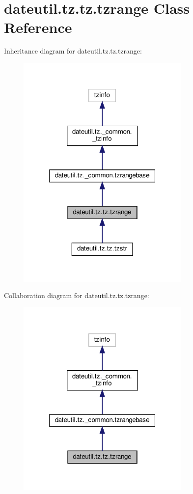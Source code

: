 \hypertarget{classdateutil_1_1tz_1_1tz_1_1tzrange}{}\section{dateutil.\+tz.\+tz.\+tzrange Class Reference}
\label{classdateutil_1_1tz_1_1tz_1_1tzrange}


Inheritance diagram for dateutil.\+tz.\+tz.\+tzrange\+:
\nopagebreak
\begin{figure}[H]
\begin{center}
\leavevmode
\includegraphics[width=241pt]{classdateutil_1_1tz_1_1tz_1_1tzrange__inherit__graph}
\end{center}
\end{figure}


Collaboration diagram for dateutil.\+tz.\+tz.\+tzrange\+:
\nopagebreak
\begin{figure}[H]
\begin{center}
\leavevmode
\includegraphics[width=241pt]{classdateutil_1_1tz_1_1tz_1_1tzrange__coll__graph}
\end{center}
\end{figure}

